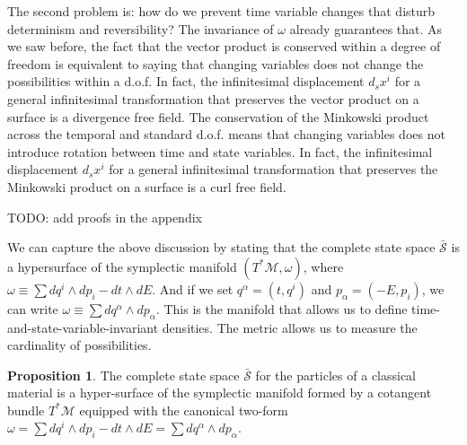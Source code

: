 \documentclass[aps,pra,10pt,twocolumn,floatfix,nofootinbib]{revtex4-1}
\numberwithin{equation}{section}
\theoremstyle{definition}
\newtheorem{prop}[equation]{Proposition}
\begin{document}
The second problem is: how do we prevent time variable changes that disturb determinism and reversibility? The invariance of $\omega$ already guarantees that. As we saw before, the fact that the vector product is conserved within a degree of freedom is equivalent to saying that changing variables does not change the possibilities within a d.o.f. In fact, the infinitesimal displacement $d_s x^i$ for a general infinitesimal transformation that preserves the vector product on a surface is a divergence free field. The conservation of the Minkowski product across the temporal and standard d.o.f. means that changing variables does not introduce rotation between time and state variables. In fact, the infinitesimal displacement $d_s x^i$ for a general infinitesimal transformation that preserves the Minkowski product on a surface is a curl free field.

TODO: add proofs in the appendix

We can capture the above discussion by stating that the complete state space $\bar{\mathcal{S}}$ is a hypersurface of the symplectic manifold $(T^*\mathcal{M}, \omega)$, where $\omega \equiv \sum dq^i \wedge dp_i - dt \wedge dE$. And if we set $q^\alpha = (t, q^i)$ and $p_\alpha = (-E, p_i)$, we can write $\omega \equiv \sum dq^\alpha \wedge dp_\alpha$. This is the manifold that allows us to define time-and-state-variable-invariant densities. The metric allows us to measure the cardinality of possibilities.

\begin{prop}\label{relativistic_symplectic_manifold}
	The complete state space $\bar{\mathcal{S}}$ for the particles of a classical material is a hyper-surface of the symplectic manifold formed by a cotangent bundle $T^*\mathcal{M}$ equipped with the canonical two-form $\omega = \sum dq^i \wedge dp_i - dt \wedge dE = \sum dq^\alpha \wedge dp_\alpha$.
\end{prop}
\end{document}
